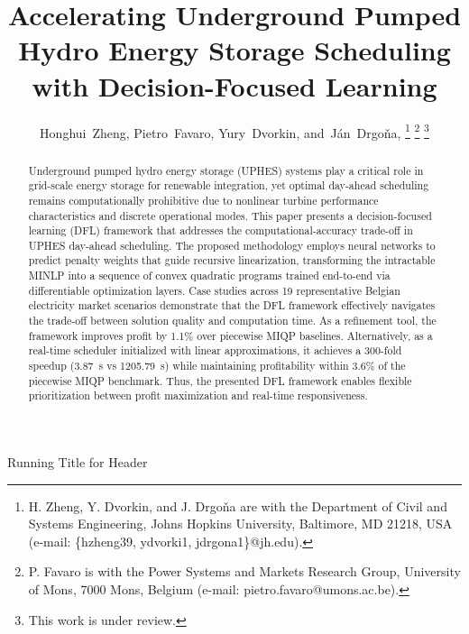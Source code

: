 \documentclass[journal]{IEEEtran}
\begin{document}
\title{Accelerating Underground Pumped Hydro Energy Storage Scheduling with Decision-Focused Learning}

\author{Honghui~Zheng,
        Pietro~Favaro,
        Yury~Dvorkin, %
        and~Ján~Drgoňa, %
\thanks{H. Zheng, Y. Dvorkin, and J. Drgoňa are with the Department of Civil and Systems Engineering, Johns Hopkins University, Baltimore, MD 21218, USA (e-mail: \{hzheng39, ydvorki1, jdrgona1\}@jh.edu).}
\thanks{P. Favaro is with the Power Systems and Markets Research Group, University of Mons, 7000 Mons, Belgium (e-mail: pietro.favaro@umons.ac.be).}
\thanks{This work is under review.}}

%
{Running Title for Header}

\maketitle

\begin{abstract}
Underground pumped hydro energy storage (UPHES) systems play a critical role in grid-scale energy storage for renewable integration, yet optimal day-ahead scheduling remains computationally prohibitive due to nonlinear turbine performance characteristics and discrete operational modes. This paper presents a decision-focused learning (DFL) framework that addresses the computational-accuracy trade-off in UPHES day-ahead scheduling. The proposed methodology employs neural networks to predict penalty weights that guide recursive linearization, transforming the intractable MINLP into a sequence of convex quadratic programs trained end-to-end via differentiable optimization layers. Case studies across 19 representative Belgian electricity market scenarios demonstrate that the DFL framework effectively navigates the trade-off between solution quality and computation time. As a refinement tool, the framework improves profit by 1.1\% over piecewise MIQP baselines. Alternatively, as a real-time scheduler initialized with linear approximations, it achieves a 300-fold speedup (3.87~s vs 1205.79~s) while maintaining profitability within 3.6\% of the piecewise MIQP benchmark. Thus, the presented DFL framework enables flexible prioritization between profit maximization and real-time responsiveness. 
\end{abstract}
\end{document}
